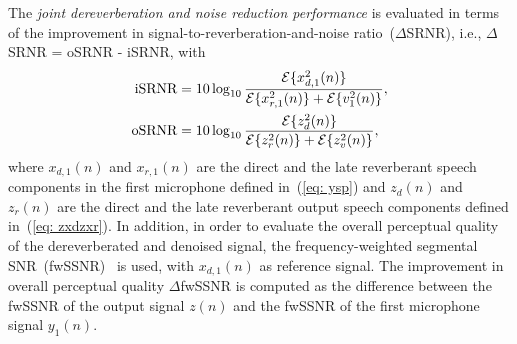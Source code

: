 \documentclass[draftcls,onecolumn,11pt]{IEEEtran}
\begin{document}
The \emph{joint dereverberation and noise reduction performance} is evaluated in terms of the improvement in signal-to-reverberation-and-noise ratio~($\Delta$SRNR), i.e., $\Delta$SRNR = oSRNR - iSRNR, with 
\begin{align}
{\text{iSRNR}} &= 10 \log_{10} \frac{{\cal{E}} \{x_{d,1}^2(n)\}}{{\cal{E}} \{x_{r,1}^2(n)\} + {\cal{E}} \{v_1^2(n)\}}, \\
{\text{oSRNR}} & = 10 \log_{10} \frac{{\cal{E}} \{z_{d}^2(n)\}}{{\cal{E}} \{z_{r}^2(n)\} + {\cal{E}} \{z_v^2(n)\}},
\end{align}
where $x_{d,1}(n)$ and $x_{r,1}(n)$ are the direct and the late reverberant speech components in the first microphone defined in~(\ref{eq: ysp}) and $z_d(n)$ and $z_r(n)$ are the direct and the late reverberant output speech components defined in~(\ref{eq: zxdzxr}).
In addition, in order to evaluate the overall perceptual quality of the dereverberated and denoised signal, the frequency-weighted segmental SNR~(fwSSNR)~\cite{Hu_ITASLP_2008} is used, with $x_{d,1}(n)$ as reference signal. 
The improvement in overall perceptual quality $\Delta$fwSSNR is computed as the difference between the fwSSNR of the output signal $z(n)$ and the fwSSNR of the first microphone signal $y_1(n)$. 
\end{document}
